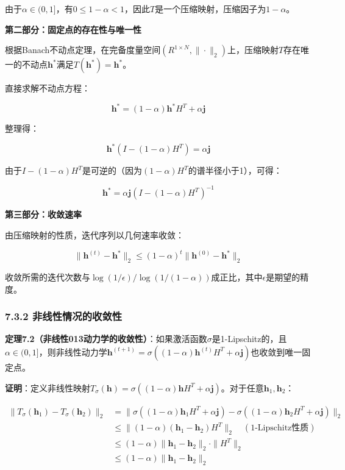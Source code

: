 \documentclass[
  12pt,
]{article}
\begin{document}
由于\(\alpha \in (0, 1]\)，有\(0 \leq 1-\alpha < 1\)，因此\(T\)是一个压缩映射，压缩因子为\(1-\alpha\)。

\textbf{第二部分：固定点的存在性与唯一性}

根据Banach不动点定理，在完备度量空间\((R^{1 \times N}, \|\cdot\|_2)\)上，压缩映射\(T\)存在唯一的不动点\(\textbf{h}^*\)满足\(T(\textbf{h}^*) = \textbf{h}^*\)。

直接求解不动点方程：

\[
\textbf{h}^* = (1-\alpha)\textbf{h}^* H^T + \alpha\textbf{j}
\]

整理得：

\[
\textbf{h}^* (I - (1-\alpha)H^T) = \alpha\textbf{j}
\]

由于\(I - (1-\alpha)H^T\)是可逆的（因为\((1-\alpha)H^T\)的谱半径小于1），可得：

\[
\textbf{h}^* = \alpha\textbf{j} (I - (1-\alpha)H^T)^{-1}
\]

\textbf{第三部分：收敛速率}

由压缩映射的性质，迭代序列以几何速率收敛：

\[
\|\textbf{h}^{(t)} - \textbf{h}^*\|_2 \leq (1-\alpha)^t \|\textbf{h}^{(0)} - \textbf{h}^*\|_2
\]

收敛所需的迭代次数与\(\log(1/\epsilon)/\log(1/(1-\alpha))\)成正比，其中\(\epsilon\)是期望的精度。

\hypertarget{ux975eux7ebfux6027ux60c5ux51b5ux7684ux6536ux655bux6027}{%
\subsubsection{7.3.2
非线性情况的收敛性}\label{ux975eux7ebfux6027ux60c5ux51b5ux7684ux6536ux655bux6027}}

\textbf{定理7.2（非线性013动力学的收敛性）}：如果激活函数\(\sigma\)是1-Lipschitz的，且\(\alpha \in (0, 1]\)，则非线性动力学\(\textbf{h}^{(t+1)} = \sigma\left((1-\alpha)\textbf{h}^{(t)}H^T + \alpha\textbf{j}\right)\)也收敛到唯一固定点。

\textbf{证明}：定义非线性映射\(T_\sigma(\textbf{h}) = \sigma\left((1-\alpha)\textbf{h}H^T + \alpha\textbf{j}\right)\)。对于任意\(\textbf{h}_1, \textbf{h}_2\)：

\[
\begin{aligned}
\|T_\sigma(\textbf{h}_1) - T_\sigma(\textbf{h}_2)\|_2 
&= \|\sigma\left((1-\alpha)\textbf{h}_1H^T + \alpha\textbf{j}\right) - \sigma\left((1-\alpha)\textbf{h}_2H^T + \alpha\textbf{j}\right)\|_2 \\
&\leq \|(1-\alpha)(\textbf{h}_1 - \textbf{h}_2)H^T\|_2 \quad (\text{1-Lipschitz性质}) \\
&\leq (1-\alpha)\|\textbf{h}_1 - \textbf{h}_2\|_2 \cdot \|H^T\|_2 \\
&\leq (1-\alpha)\|\textbf{h}_1 - \textbf{h}_2\|_2
\end{aligned}
\]
\end{document}
